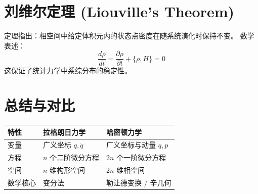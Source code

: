 \documentclass[11pt,a4paper]{article}
\begin{document}
\section{刘维尔定理 (Liouville's Theorem)}
定理指出：相空间中给定体积元内的状态点密度在随系统演化时保持不变。
数学表述：
\[ \frac{d\rho}{dt} = \frac{\partial \rho}{\partial t} + \{\rho, H\} = 0 \]
这保证了统计力学中系综分布的稳定性。

\section{总结与对比}
\begin{center}
\begin{tabular}{|l|l|l|}
\hline
特性 & 拉格朗日力学 & 哈密顿力学 \\
\hline
变量 & 广义坐标 $q, \dot{q}$ & 广义坐标与动量 $q, p$ \\
方程 & $n$ 个二阶微分方程 & $2n$ 个一阶微分方程 \\
空间 & $n$ 维构形空间 & $2n$ 维相空间 \\
数学核心 & 变分法 & 勒让德变换 / 辛几何 \\
\hline
\end{tabular}
\end{center}
\end{document}
